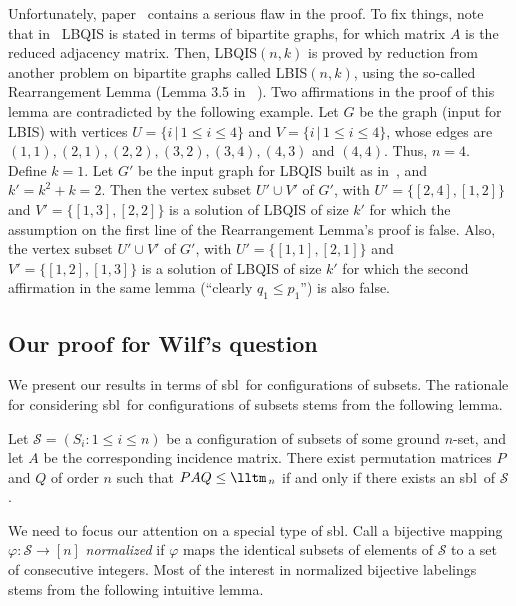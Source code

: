 \documentclass[a4paper,10pt]{llncs}
\newcommand{\SBL}{sbl}
\begin{document}
Unfortunately, paper~\cite{DasGuptaJiangKannanLiSweedyk:1998} 
contains a serious flaw in the proof. To fix things, note that
in~\cite{DasGuptaJiangKannanLiSweedyk:1998} LBQIS is stated in
terms of bipartite graphs, for which matrix $A$ is the reduced adjacency
matrix. Then, LBQIS$(n,k)$ is proved \NPC by reduction 
from another problem on bipartite graphs called LBIS$(n,k)$, using the so-called 
Rearrangement Lemma (Lemma 3.5 in ~\cite{DasGuptaJiangKannanLiSweedyk:1998}).
Two affirmations in the proof of this lemma are contradicted by the following
example. Let $G$ be the graph (input for LBIS) with vertices $U=\{i\, |\, 1\leq i\leq 4\}$
and $V=\{i\, |\, 1\leq i\leq 4\}$, whose edges are $(1,1), (2,1), (2,2),
(3,2), (3,4), (4,3)$ and $(4,4)$. Thus, $n=4$. Define $k=1$.  
Let $G'$ be the input graph for LBQIS built as in~\cite{DasGuptaJiangKannanLiSweedyk:1998},
and $k'=k^2+k=2$. Then the vertex subset $U'\cup V'$ of $G'$, with $U'=\{[2,4], [1,2]\}$
and $V'=\{[1,3], [2,2]\}$ is a solution of LBQIS of size $k'$ for which the
assumption on the first line of the Rearrangement Lemma's proof is false.
Also, the vertex subset $U'\cup V'$ of $G'$, with $U'=\{[1,1], [2,1]\}$
and $V'=\{[1,2], [1,3]\}$ is a solution of LBQIS of size $k'$ for which
the second affirmation in the same lemma (``clearly $q_1\leq p_1$'') is also false.

\subsection{Our \NPcompleteness proof for Wilf's question}

We present our results in terms of \SBL\ for configurations
of subsets. The rationale for considering \SBL\ for configurations
of subsets stems from the following lemma.

\begin{lemma}
    \label{lemma:bounded stepwise property <=> PAQ triangular}
    Let $\mathcal{S} = (S_i : 1 \leq i \leq n)$ be a configuration of subsets of
    some ground $n$-set, and let $A$ be the corresponding incidence matrix.
    There exist permutation matrices $P$ and $Q$ of order $n$
    such that $PAQ \leq \lltm_{\,n}$ if and only if
    there exists an \SBL\ of $\mathcal{S}$.
\end{lemma}

We need to focus our attention on a special type of \SBL. Call a bijective mapping
$\varphi : \mathcal{S} \to [n]$ \emph{normalized} if $\varphi$
maps the identical subsets of elements of $\mathcal{S}$
to a set of consecutive integers.
Most of the interest in normalized bijective labelings
stems from the following intuitive lemma.
\end{document}
